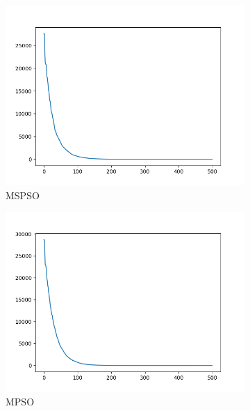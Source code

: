 \documentclass[12pt]{article}
\begin{document}
\begin{figure}[H]
    \centering
    \begin{subfigure}{0.32\textwidth}
        \centering
        \includegraphics[width=\linewidth]{plots/MSPSO/sphere.png}
        \caption{MSPSO}
    \end{subfigure}
    \begin{subfigure}{0.32\textwidth}
        \centering
        \includegraphics[width=\linewidth]{plots/MPSO/sphere.png}
        \caption{MPSO}
    \end{subfigure}
    \begin{subfigure}{0.32\textwidth}
        \centering

\end{subfigure}
\end{figure}
\end{document}
